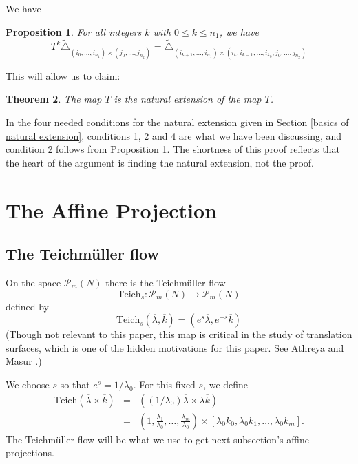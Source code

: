 \documentclass[12pt,oneside,openany]{article}
\newtheorem{theorem}{Theorem}[section]
\newtheorem{prop}[theorem]{Proposition}
\begin{document}
We have 

\begin{prop}\label{homog cylinders}   For all integers  $k$ with $0\leq k \leq n_1$, we have 
$$T^{k}\tilde{\triangle}_{  (i_0, \ldots, i_{n_1})\times (j_0, \ldots, j_{n_2})   } =   \tilde{\triangle}_{ (i_{k+1},  \ldots, i_{n_1}) \times  (i_k, i_{k-1}, \ldots, i_{k_0}, j_0, \ldots, j_{n_2} ) }  $$
\end{prop}

This will allow us to claim:
\begin{theorem}\label{homog natural exension} The map $\tilde{T}$ is the natural extension of the map $T$.



\end{theorem}
  In the four needed conditions for the natural extension given in Section \ref{basics of natural extension}, conditions 1, 2 and 4 are what we have been discussing, and condition 2 follows from Proposition \ref{homog cylinders}.  The shortness of this proof reflects that the heart of the argument is finding the natural extension, not the proof.  

\section{The Affine Projection}\label{affine projection}


\subsection{The Teichm\"{u}ller flow}
On the space $\mathcal{P}_m(N)$ there is the Teichm\"{u}ller flow
$$\mbox{Teich}_{s}:  \mathcal{P}_m(N) \rightarrow   \mathcal{P}_m(N) $$
defined by 
$$ \mbox{Teich}_s (\overline{\lambda}, \overline{k}) = (e^s \overline{\lambda}, e^{-s}\overline{k}) $$
(Though not relevant to this paper, this map is critical in the study of translation surfaces, which is one of the  hidden  motivations for this paper.  See Athreya and Masur \cite{Athreya-Masur}.)

We  choose $s$ so that $e^s = 1/\lambda_0.$  For this fixed $s$, we define
\begin{eqnarray*}
\mbox{Teich} (\overline{\lambda} \times \overline{k})  &=&  ((1/\lambda_0) \overline{\lambda}\times  \lambda \overline{k}) \\
&=& \left( 1, \frac{\lambda_1}{\lambda_0}, \ldots,  \frac{\lambda_m}{\lambda_0} \right) \times \left[ \lambda_0 k_0, \lambda_0 k_1, \ldots, \lambda_0 k_m\right].
\end{eqnarray*}
The Teichm\"{u}ller flow will be what we use to get next subsection's affine projections.
\end{document}
